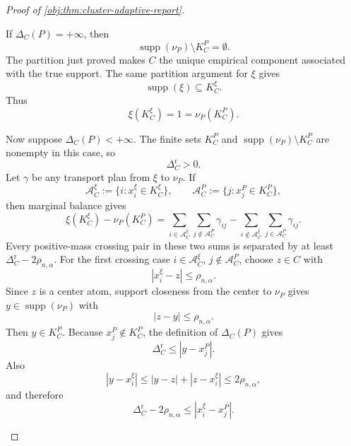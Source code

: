 \documentclass[11pt]{article}
\begin{document}
\begin{proof}[Proof of \cref{obj:thm:cluster-adaptive-report}]
\begin{enumerate}
If \(\Delta_C(P)=+\infty\), then
\[
\operatorname{supp}(\nu_P)\setminus K_C^P=\emptyset .
\]
The partition just proved makes \(C\) the unique empirical component associated
with the true support.  The same partition argument for \(\xi\) gives
\[
\operatorname{supp}(\xi)\subseteq K_C^\xi.
\]
Thus
\[
\xi(K_C^\xi)=1=\nu_P(K_C^P).
\]

Now suppose \(\Delta_C(P)<+\infty\).  The finite sets \(K_C^P\) and
\(\operatorname{supp}(\nu_P)\setminus K_C^P\) are nonempty in this case, so
\[
\Delta_C^{\mathrm r}>0.
\]
Let \(\gamma\) be any transport plan from \(\xi\) to \(\nu_P\).  If
\[
\mathscr A_C^\xi:=\{i:x_i^\xi\in K_C^\xi\},
\qquad
\mathscr A_C^P:=\{j:x_j^P\in K_C^P\},
\]
then marginal balance gives
\[
\xi(K_C^\xi)-\nu_P(K_C^P)
=
\sum_{i\in\mathscr A_C^\xi}\sum_{j\notin\mathscr A_C^P}\gamma_{ij}
-
\sum_{i\notin\mathscr A_C^\xi}\sum_{j\in\mathscr A_C^P}\gamma_{ij}.
\]
Every positive-mass crossing pair in these two sums is separated by at least
\(\Delta_C^{\mathrm r}-2\rho_{n,\alpha}\).  For the first crossing case
\(i\in\mathscr A_C^\xi\), \(j\notin\mathscr A_C^P\), choose
\(z\in C\) with
\[
|x_i^\xi-z|\le\rho_{n,\alpha}.
\]
Since \(z\) is a center atom, support closeness from the center to \(\nu_P\)
gives \(y\in\operatorname{supp}(\nu_P)\) with
\[
|z-y|\le\rho_{n,\alpha}.
\]
Then \(y\in K_C^P\).  Because \(x_j^P\notin K_C^P\), the definition of
\(\Delta_C(P)\) gives
\[
\Delta_C^{\mathrm r}\le |y-x_j^P|.
\]
Also
\[
|y-x_i^\xi|\le |y-z|+|z-x_i^\xi|\le2\rho_{n,\alpha},
\]
and therefore
\[
\Delta_C^{\mathrm r}-2\rho_{n,\alpha}
\le |x_i^\xi-x_j^P|.
\]


\end{enumerate}
\end{proof}
\end{document}
